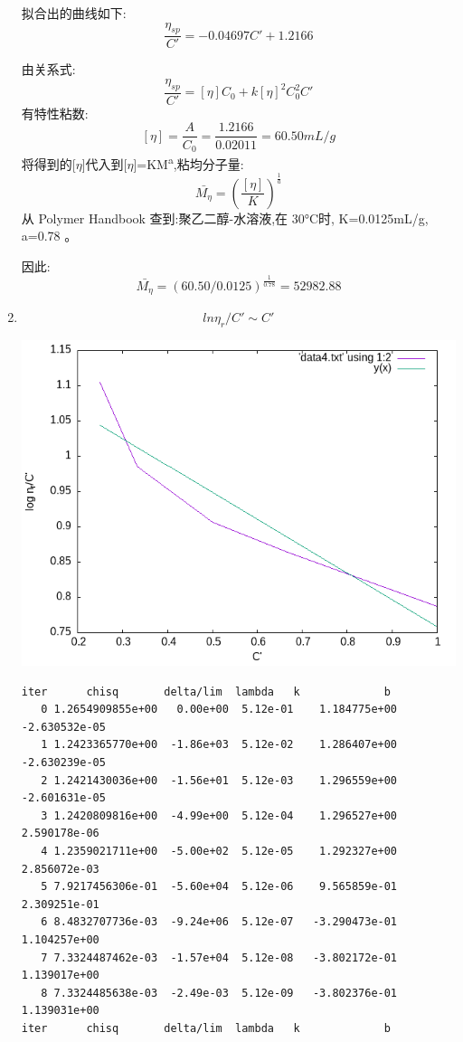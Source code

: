 \documentclass[11pt]{report}
\begin{document}
\begin{enumerate}
\begin{verbatim}
\end{verbatim}
拟合出的曲线如下:
\[
\frac{\eta_{sp}}{C'}=-0.04697C'+1.2166
\]

由关系式:
\[
\frac{\eta_{sp}}{C'}=[\eta]C_{0}+k[\eta]^{2}C_{0}^{2}C'
\]
有特性粘数:
\[
[\eta]=\frac{A}{C_{0}}=\frac{1.2166}{0.02011}=60.50mL/g
\]
将得到的[\(\eta\)]代入到[\(\eta\)]=KM\textsuperscript{a},粘均分子量:
\[
\bar{M_{\eta}}=\left(\frac{[\eta]}{K}\right)^{\frac{1}{a}}
\]
从 Polymer Handbook 查到:聚乙二醇-水溶液,在 30°C时, K=0.0125mL/g,
a=0.78 。

因此:
\[
\bar{M_{\eta}}=(60.50/0.0125)^{\frac{1}{0.78}}=52982.88
\]
\item 
\label{sec:org6eeb011}

\[
ln\eta_{r}/C' \sim C'
\]
\begin{center}
\includegraphics[width=.9\linewidth]{../data/out4.png}
\end{center}
\begin{verbatim}
iter      chisq       delta/lim  lambda   k             b            
   0 1.2654909855e+00   0.00e+00  5.12e-01    1.184775e+00  -2.630532e-05
   1 1.2423365770e+00  -1.86e+03  5.12e-02    1.286407e+00  -2.630239e-05
   2 1.2421430036e+00  -1.56e+01  5.12e-03    1.296559e+00  -2.601631e-05
   3 1.2420809816e+00  -4.99e+00  5.12e-04    1.296527e+00   2.590178e-06
   4 1.2359021711e+00  -5.00e+02  5.12e-05    1.292327e+00   2.856072e-03
   5 7.9217456306e-01  -5.60e+04  5.12e-06    9.565859e-01   2.309251e-01
   6 8.4832707736e-03  -9.24e+06  5.12e-07   -3.290473e-01   1.104257e+00
   7 7.3324487462e-03  -1.57e+04  5.12e-08   -3.802172e-01   1.139017e+00
   8 7.3324485638e-03  -2.49e-03  5.12e-09   -3.802376e-01   1.139031e+00
iter      chisq       delta/lim  lambda   k             b            


\end{verbatim}
\end{enumerate}
\end{document}

